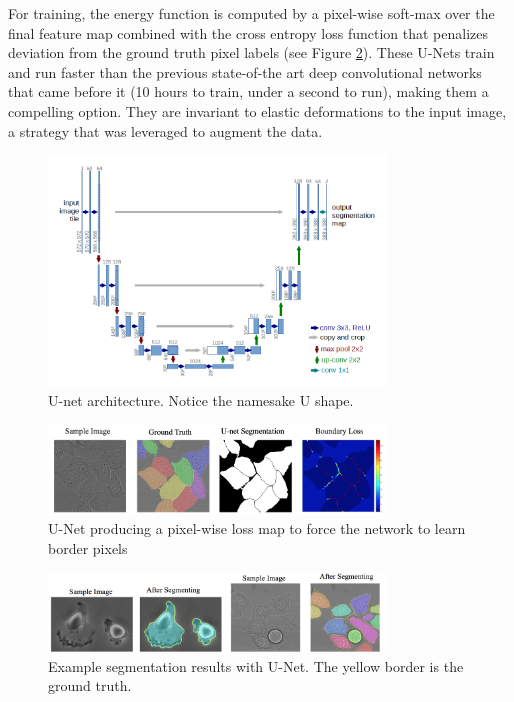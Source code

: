 \documentclass{article}
\begin{document}
\begin{enumerate}
For training, the energy function is computed by a pixel-wise soft-max over the final
feature map combined with the cross entropy loss function that penalizes deviation from the ground truth pixel labels (see Figure \ref{fig:unet_training}). These U-Nets train and run faster than the previous state-of-the art deep convolutional networks that came before it (10 hours to train, under a second to run), making them a compelling option. They are invariant to elastic deformations to the input image, a strategy that was leveraged to augment the data.


\begin{figure}[h]
    \centering
    \includegraphics[width=0.8\textwidth]{21/unet.png}
    \caption{U-net architecture. Notice the namesake U shape.}
    \label{fig:U-net}
\end{figure}


\begin{figure}[h]
    \centering
    \includegraphics[width=0.8\textwidth]{21/unet_borders.png}
    \caption{U-Net producing a pixel-wise loss map to force the network to learn border pixels}
    \label{fig:unet_training}
\end{figure}




\begin{figure}[!]
    \centering
    \includegraphics[width=0.8\textwidth]{21/unet_results.png}
    \caption{Example segmentation results with U-Net. The yellow border is the ground truth.}
    \label{fig:unet_results}
\end{figure}






\end{enumerate}
\end{document}
